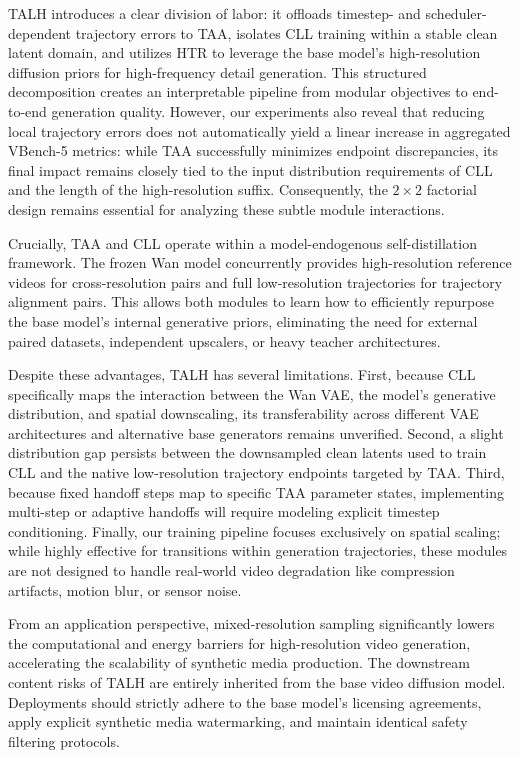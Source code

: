 TALH introduces a clear division of labor: it offloads timestep- and scheduler-dependent trajectory errors to TAA, isolates CLL training within a stable clean latent domain, and utilizes HTR to leverage the base model's high-resolution diffusion priors for high-frequency detail generation. This structured decomposition creates an interpretable pipeline from modular objectives to end-to-end generation quality. However, our experiments also reveal that reducing local trajectory errors does not automatically yield a linear increase in aggregated VBench-5 metrics: while TAA successfully minimizes endpoint discrepancies, its final impact remains closely tied to the input distribution requirements of CLL and the length of the high-resolution suffix. Consequently, the \(2\times2\) factorial design remains essential for analyzing these subtle module interactions.

Crucially, TAA and CLL operate within a model-endogenous self-distillation framework. The frozen Wan model concurrently provides high-resolution reference videos for cross-resolution pairs and full low-resolution trajectories for trajectory alignment pairs. This allows both modules to learn how to efficiently repurpose the base model's internal generative priors, eliminating the need for external paired datasets, independent upscalers, or heavy teacher architectures.

Despite these advantages, TALH has several limitations. First, because CLL specifically maps the interaction between the Wan VAE, the model's generative distribution, and spatial downscaling, its transferability across different VAE architectures and alternative base generators remains unverified. Second, a slight distribution gap persists between the downsampled clean latents used to train CLL and the native low-resolution trajectory endpoints targeted by TAA. Third, because fixed handoff steps map to specific TAA parameter states, implementing multi-step or adaptive handoffs will require modeling explicit timestep conditioning. Finally, our training pipeline focuses exclusively on spatial scaling; while highly effective for transitions within generation trajectories, these modules are not designed to handle real-world video degradation like compression artifacts, motion blur, or sensor noise.

From an application perspective, mixed-resolution sampling significantly lowers the computational and energy barriers for high-resolution video generation, accelerating the scalability of synthetic media production. The downstream content risks of TALH are entirely inherited from the base video diffusion model. Deployments should strictly adhere to the base model's licensing agreements, apply explicit synthetic media watermarking, and maintain identical safety filtering protocols.

